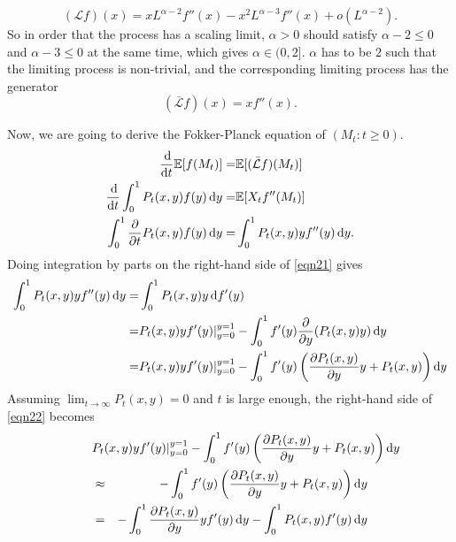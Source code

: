 \begin{enumerate}
        \begin{equation*}
            (\mathcal{L}f)(x) = x L^{\alpha - 2} f''(x)  - x^2 L^{\alpha - 3}f''(x) + o(L^{\alpha - 2}).
        \end{equation*}
        So in order that the process has a scaling limit, $\alpha > 0$ should satisfy $\alpha -2 \le 0$ and $\alpha - 3 \le 0$ at the same time, which gives $\alpha \in (0, 2]$. $\alpha$ has to be $2$ such that the limiting process is non-trivial, and the corresponding limiting process has the generator 
        \begin{equation*}
            (\bar{\mathcal{L}}f)(x) = x f''(x).
        \end{equation*}

        Now, we are going to derive the Fokker-Planck equation of $(M_t: t \ge 0)$.
        \begin{align}\label{eqn21}
            \frac{\dif}{\dif t} \mbb{E} [f(M_t)] = & \mbb{E} [(\bar{\mathcal{L}}f)(M_t)] \notag \\ 
            \frac{\dif}{\dif t} \int_{0}^1 P_t(x, y) f(y) \dif y = & \mbb{E} [X_t f''(M_t)] \notag \\ 
            \int_0^1 \frac{\partial}{\partial t} P_t(x, y) f(y) \dif y  = &\int_0^1 P_t(x,y) y f''(y) \dif y.
        \end{align}
        Doing integration by parts on the right-hand side of \eqref{eqn21} gives 
        \begin{align}\label{eqn22}
            \int_0^1 P_t(x,y) y f''(y) \dif y = & \int_0^1 P_t(x,y) y \dif f'(y) \notag \\ 
            = & P_t(x,y) y f'(y) |_{y = 0}^{y = 1} - \int_0^1 f'(y) \frac{\partial}{\partial y} (P_t(x,y) y)  \dif y \notag \\ 
            = & P_t(x,y) y f'(y) |_{y = 0}^{y = 1} - \int_0^1 f'(y)  \left( \frac{\partial P_t(x,y)}{\partial y} y + P_t(x,y) \right) \dif y
        \end{align}
        Assuming $ \lim_{t\to\infty} P_t(x,y) = 0$ and $t$ is large enough,  the right-hand side of \eqref{eqn22} becomes 
        \begin{eqnarray}\label{eqn23}
            \lefteqn{P_t(x,y) y f'(y) |_{y = 0}^{y = 1} - \int_0^1 f'(y)  \left( \frac{\partial P_t(x,y)}{\partial y} y + P_t(x,y) \right) \dif y} & & \notag \\ 
            & \approx &  - \int_0^1 f'(y)  \left( \frac{\partial P_t(x,y)}{\partial y} y + P_t(x,y) \right) \dif y \notag \\ 
            & = & - \int_0^1 \frac{\partial P_t(x,y)}{\partial y} y f'(y) \dif y - \int_0^1 P_t(x,y) f'(y) \dif y \notag \\ 

\end{eqnarray}
\end{enumerate}
